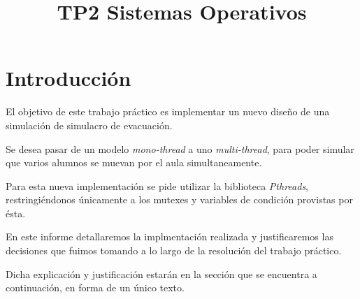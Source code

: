 \documentclass[a4paper]{article}
\title{TP2 Sistemas Operativos}
\begin{document}

\thispagestyle{empty}

\maketitle
\newpage

\thispagestyle{empty}
\vfill
\thispagestyle{empty}
\vspace{1.5cm}
\tableofcontents
\newpage

 
\newpage

\section{Introducción}

El objetivo de este trabajo práctico es implementar un nuevo diseño de una
simulación de simulacro de evacuación.

Se desea pasar de un modelo  \textit{mono-thread} a uno
\textit{multi-thread}, para poder simular que varios alumnos se muevan por
el aula simultaneamente.

Para esta nueva implementación se pide utilizar la biblioteca
\textit{Pthreads}, restringiéndonos únicamente a los mutexes y variables de
condición provistas por ésta.

En este informe detallaremos la implmentación realizada y justificaremos
las decisiones que fuimos tomando a lo largo de la resolución del trabajo práctico.


Dicha explicación y justificación estarán en la sección que se encuentra a
continuación, en forma de un único texto.



\newpage
\end{document}

